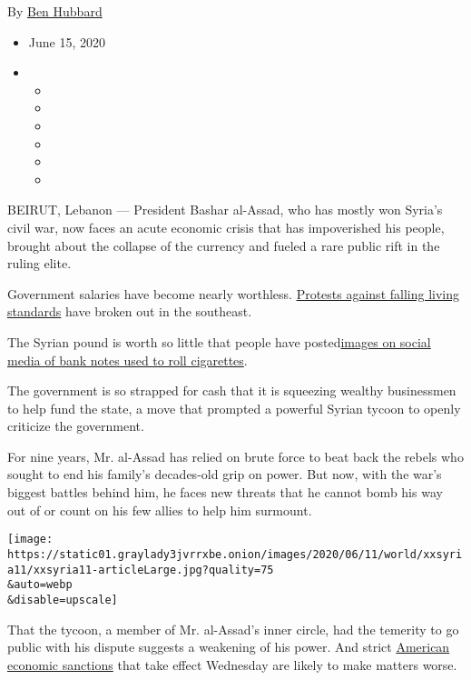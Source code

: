 By \href{https://www.nytimes3xbfgragh.onion/by/ben-hubbard}{Ben Hubbard}

\begin{itemize}
\item
  June 15, 2020
\item
  \begin{itemize}
  \item
  \item
  \item
  \item
  \item
  \item
  \end{itemize}
\end{itemize}

BEIRUT, Lebanon --- President Bashar al-Assad, who has mostly won
Syria's civil war, now faces an acute economic crisis that has
impoverished his people, brought about the collapse of the currency and
fueled a rare public rift in the ruling elite.

Government salaries have become nearly worthless.
\href{https://www.facebookcorewwwi.onion/watch/?v=962481407516349}{Protests
against falling living standards} have broken out in the southeast.

The Syrian pound is worth so little that people have
posted\href{https://twitter.com/Ferhad49838610/status/1269950887218360320}{images
on social media of bank notes used to roll cigarettes}.

The government is so strapped for cash that it is squeezing wealthy
businessmen to help fund the state, a move that prompted a powerful
Syrian tycoon to openly criticize the government.

For nine years, Mr. al-Assad has relied on brute force to beat back the
rebels who sought to end his family's decades-old grip on power. But
now, with the war's biggest battles behind him, he faces new threats
that he cannot bomb his way out of or count on his few allies to help
him surmount.

\texttt{[image: https://static01.graylady3jvrrxbe.onion/images/2020/06/11/world/xxsyria11/xxsyria11-articleLarge.jpg?quality=75\\\&auto=webp\\\&disable=upscale]}

That the tycoon, a member of Mr. al-Assad's inner circle, had the
temerity to go public with his dispute suggests a weakening of his
power. And strict
\href{https://www.nytimes3xbfgragh.onion/2019/12/16/us/politics/us-syria-sanctions-war-crimes.html}{American
economic sanctions} that take effect Wednesday are likely to make
matters worse.

